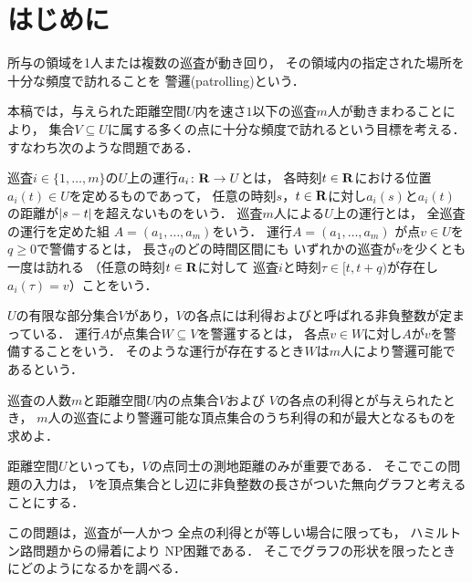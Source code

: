 \section{はじめに}
所与の領域を1人または複数の巡査が動き回り，
その領域内の指定された場所を十分な頻度で訪れることを
警邏(patrolling)という\cite{chen2013fence, coene2011charlemagne, czyzowicz2011boundary}．


本稿では，与えられた距離空間$U$内を速さ$1$以下の巡査$m$人が動きまわることにより，
集合$V \subseteq U$に属する多くの点に十分な頻度で訪れるという目標を考える．
すなわち次のような問題である．

巡査$i \in \{1, \ldots, m\}$の$U$上の運行$a _i \colon \mathbf R \to U$とは，
各時刻$t \in \mathbf R$における位置$a _i (t) \in U$を定めるものであって，
任意の時刻$s$，$t \in \mathbf R$に対し$a _i (s)$と$a _i (t)$の距離が$\lvert{s - t}\rvert$を超えないものをいう．
巡査$m$人による$U$上の運行とは，
全巡査の運行を定めた組
$A = (a _1, \dots, a _m)$をいう．
運行$A = (a _1, \dots, a _m)$
が点$v \in U$を{\idletime}$q \geq 0$で警備するとは，
長さ$q$のどの時間区間にも
いずれかの巡査が$v$を少くとも一度は訪れる
（任意の時刻$t \in \mathbf R$に対して
巡査$i$と時刻$\tau \in [t, t + q)$が存在し
$a _i (\tau) = v$）ことをいう．

$U$の有限な部分集合$V$があり，$V$の各点には利得および{\idletime}と呼ばれる非負整数が定まっている．
運行$A$が点集合$W \subseteq V$を警邏するとは，
各点$v \in W$に対し$A$が$v$を警備することをいう．
そのような運行が存在するとき$W$は$m$人により警邏可能であるという．

\begin{cooperativepatrollingproblem}
  巡査の人数$m$と距離空間$U$内の点集合$V$および
  $V$の各点の利得と{\idletime}が与えられたとき，
  $m$人の巡査により警邏可能な頂点集合のうち利得の和が最大となるものを求めよ．
\end{cooperativepatrollingproblem}

距離空間$U$といっても，$V$の点同士の測地距離のみが重要である．
そこでこの問題の入力は，
$V$を頂点集合とし辺に非負整数の長さがついた無向グラフと考えることにする．

この問題は，巡査が一人かつ
全点の利得と{\idletime}が等しい場合に限っても，
ハミルトン路問題からの帰着により
NP困難である\cite[Theorem~8]{coene2011charlemagne}．
そこでグラフの形状を限ったときにどのようになるかを調べる．

